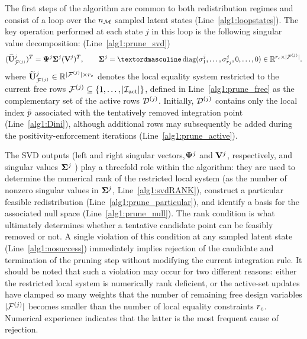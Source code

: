 \documentclass[11pt,a4paper]{article}
\begin{document}
The first steps of the algorithm are common to both redistribution
regimes and consist of a loop over the \(n_{\mathcal{M}}\) sampled latent states
(Line~\ref{alg1:loopstates}). The key operation performed at each state $j$ in this loop
is the following  singular value decomposition:
(Line~\ref{alg1:prune_svd})
\begin{equation}
\label{eq:fullSVD}
({\Uactj{j}}_{\Fj{j}})^T
=
\Psij{j}\Sigmaj{j}(\Vj{j})^T,
\qquad
\Sigmaj{j}
=
º\diag(\sigma_1^{j},\ldots,\sigma_{\rj}^{j},0,\ldots,0) \in
\mathbb{R}^{\ncond\times|\Fj{j}|}.
\end{equation}
where
\(
{\widetilde{\mathbf{U}}^{j}}_{\mathcal{F}^{(j)}}
\in
\mathbb{R}^{|\mathcal{F}^{(j)}|\times r_c}
\)
denotes the local equality system restricted to the current free rows
\(\mathcal{F}^{(j)}\subseteq\{1,\ldots,|\mathcal{I}_{\mathrm{act}}|\}\), defined in Line~\ref{alg1:prune_free} as the complementary set of the active rows $\mathcal{D}^{(j)}$. Initially, \(\mathcal{D}^{(j)}\) contains only the
local index \(\bar{p}\) associated with the tentatively removed
integration point (Line~\ref{alg1:Dini}), although additional rows may
subsequently be added during the positivity-enforcement iterations
(Line~\ref{alg1:prune_active}).

The SVD outputs (left and right singular vectors,$\boldsymbol{\Psi}^{j}$ and $\mathbf{V}^{j}$, respectively, and singular values $\boldsymbol{\Sigma}^{j}$  ) play a threefold role within the algorithm: they are
used to determine the numerical rank of the restricted local system
(as the number of nonzero
singular values in \(\boldsymbol{\Sigma}^{j}\), Line~\ref{alg1:svdRANK}), construct a particular feasible
redistribution (Line~\ref{alg1:prune_particular}), and identify a basis
for the associated null space
(Line~\ref{alg1:prune_null}).  The rank condition is what ultimately determines whether a tentative
candidate point can be feasibly removed or not. A single violation of this condition at any sampled latent state
(Line~\ref{alg1:nosuccess}) immediately implies rejection of the
candidate and termination of the pruning step without modifying the
current integration rule. It should be noted that such a violation may
occur for two different reasons: either the restricted local system is
numerically rank deficient, or the active-set updates have clamped so
many weights that the number of remaining free design variables  $|\mathcal{F}^{(j)}|$  becomes
smaller than the number of local equality constraints \(r_c\). Numerical experience indicates that the latter is the most frequent cause of rejection.


\end{document}
